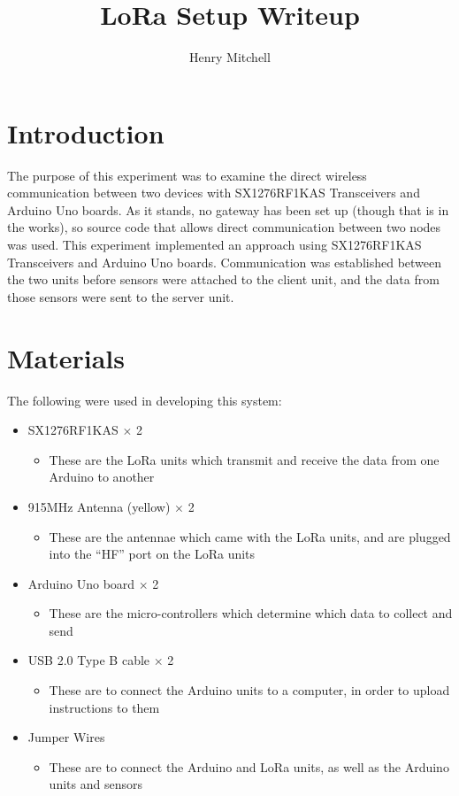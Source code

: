 \documentclass[11pt,onecolumn]{IEEEtran}
\author{Henry Mitchell}
\title{LoRa Setup Writeup}
\date{}
\begin{document}
\maketitle

\section{Introduction}
\label{sec:intro}

The purpose of this experiment was to examine the direct wireless communication between two devices with SX1276RF1KAS Transceivers and Arduino Uno boards.
As it stands, no gateway has been set up (though that is in the works), so source code that allows direct communication between two nodes was used.
This experiment implemented an approach using SX1276RF1KAS Transceivers and Arduino Uno boards.
Communication was established between the two units before sensors were attached to the client unit, and the data from those sensors were sent to the server unit.

\section{Materials}
\label{sec:materials}

The following were used in developing this system:
\begin{itemize}
  \item
    SX1276RF1KAS $\times$ 2
    \begin{itemize}
      \item These are the LoRa units which transmit and receive the data from one Arduino to another
    \end{itemize}
  \item
    915MHz Antenna (yellow) $\times$ 2
    \begin{itemize}
      \item These are the antennae which came with the LoRa units, and are plugged into the ``HF'' port on the LoRa units
    \end{itemize}
  \item
    Arduino Uno board $\times$ 2
    \begin{itemize}
      \item These are the micro-controllers which determine which data to collect and send
    \end{itemize}
  \item
    USB 2.0 Type B cable $\times$ 2
    \begin{itemize}
      \item These are to connect the Arduino units to a computer, in order to upload instructions to them
    \end{itemize}
  \item
    Jumper Wires
    \begin{itemize}
      \item These are to connect the Arduino and LoRa units, as well as the Arduino units and sensors
    \end{itemize}

\end{itemize}
\end{document}
